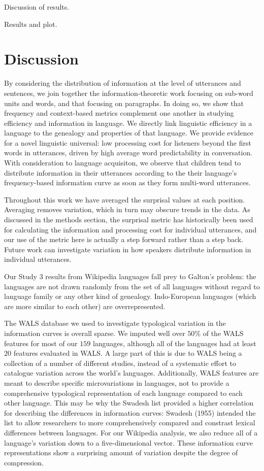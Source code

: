 \documentclass[man,floatsintext]{apa6}
\begin{document}
Discussion of results.

Results and plot.

\hypertarget{discussion}{%
\section{Discussion}\label{discussion}}

By considering the distribution of information at the level of utterances and sentences, we join together the information-theoretic work focusing on sub-word units and words, and that focusing on paragraphs. In doing so, we show that frequency and context-based metrics complement one another in studying efficiency and information in language. We directly link linguistic efficiency in a language to the genealogy and properties of that language. We provide evidence for a novel linguistic universal: low processing cost for listeners beyond the first words in utterances, driven by high average word predictability in conversation. With consideration to language acquisiton, we observe that children tend to distribute information in their utterances according to the their language's frequency-based information curve as soon as they form multi-word utterances.

Throughout this work we have averaged the surprisal values at each position. Averaging removes variation, which in turn may obscure trends in the data. As discussed in the methods section, the surprisal metric has historically been used for calculating the information and processing cost for individual utterances, and our use of the metric here is actually a step forward rather than a step back. Future work can investigate variation in how speakers distribute information in individual utterances.

Our Study 3 results from Wikipedia languages fall prey to Galton's problem: the languages are not drawn randomly from the set of all languages without regard to language family or any other kind of genealogy. Indo-European languages (which are more similar to each other) are overrepresented.

The WALS database we used to investigate typological variation in the information curves is overall sparse. We imputed well over \(50\%\) of the WALS features for most of our \(159\) languages, although all of the languages had at least \(20\) features evaluated in WALS. A large part of this is due to WALS being a collection of a number of different studies, instead of a systematic effort to catalogue variation across the world's languages. Additionally, WALS features are meant to describe specific microvariations in languages, not to provide a comprehensive typological representation of each language compared to each other language. This may be why the Swadesh list provided a higher correlation for describing the differences in information curves: Swadesh (1955) intended the list to allow researchers to more comprehensively compared and constrast lexical differences between languages. For our Wikipedia analysis, we also reduce all of a language's variation down to a five-dimensional vector. These information curve representations show a surprising amount of variation despite the degree of compression.
\end{document}
